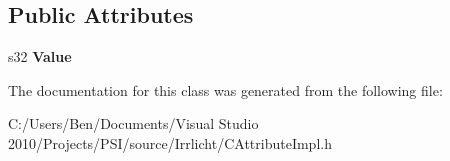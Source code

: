 \subsection*{Public Attributes}
\begin{DoxyCompactItemize}
\item 
\hypertarget{classirr_1_1io_1_1_c_int_attribute_a826145325283a105227d8d9aa52006cb}{s32 {\bfseries Value}}\label{classirr_1_1io_1_1_c_int_attribute_a826145325283a105227d8d9aa52006cb}

\end{DoxyCompactItemize}


The documentation for this class was generated from the following file\-:\begin{DoxyCompactItemize}
\item 
C\-:/\-Users/\-Ben/\-Documents/\-Visual Studio 2010/\-Projects/\-P\-S\-I/source/\-Irrlicht/C\-Attribute\-Impl.\-h\end{DoxyCompactItemize}
